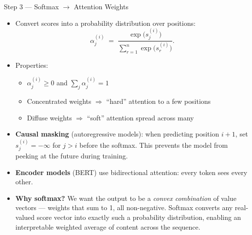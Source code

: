\documentclass[10pt,english,aspectratio=169]{beamer}
\begin{document}
\begin{frame}{Step 3 --- Softmax $\rightarrow$ Attention Weights}
\begin{itemize}
\item Convert scores into a probability distribution over positions:
\[
   \alpha_{j}^{(i)} \;=\; \frac{\exp\bigl(s_{j}^{(i)}\bigr)}{\sum_{r=1}^{n}\exp\bigl(s_{r}^{(i)}\bigr)}.
\]

\medskip
\item Properties:
\begin{itemize}
    \item $\alpha_{j}^{(i)} \ge 0$ and $\sum_{j}\alpha_{j}^{(i)} = 1$
    \item Concentrated weights $\Rightarrow$ ``hard'' attention to a few positions
    \item Diffuse weights $\Rightarrow$ ``soft'' attention spread across many
\end{itemize}

\medskip
\item \textbf{Causal masking} (autoregressive models): when predicting position $i+1$, set $s_{j}^{(i)} = -\infty$ for $j > i$ before the softmax. This prevents the model from peeking at the future during training.

\medskip
\item \textbf{Encoder models} (BERT) use bidirectional attention: every token sees every other.

\medskip
\item \textbf{Why softmax?} We want the output to be a \emph{convex combination} of value vectors --- weights that sum to 1, all non-negative. Softmax converts any real-valued score vector into exactly such a probability distribution, enabling an interpretable weighted average of content across the sequence.
\end{itemize}
\end{frame}
\end{document}
